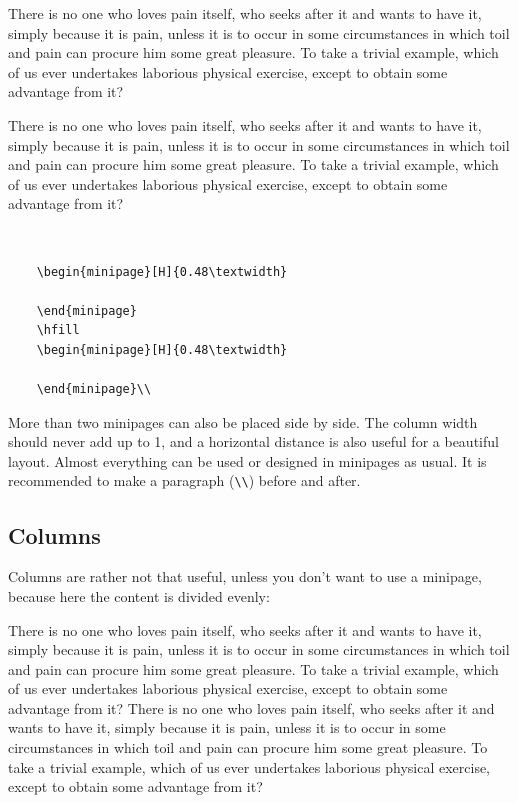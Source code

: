 \begin{minipage}[H]{0.48\textwidth}
	There is no one who loves pain itself, who seeks after it and wants to have it, simply because it is pain, unless it is to occur in some circumstances in which toil and pain can procure him some great pleasure. To take a trivial example, which of us ever undertakes laborious physical exercise, except to obtain some advantage from it?
\end{minipage}
\hfill
\begin{minipage}[H]{0.48\textwidth}
	There is no one who loves pain itself, who seeks after it and wants to have it, simply because it is pain, unless it is to occur in some circumstances in which toil and pain can procure him some great pleasure. To take a trivial example, which of us ever undertakes laborious physical exercise, except to obtain some advantage from it?
\end{minipage}\\

\begin{verbatim}
    \begin{minipage}[H]{0.48\textwidth}
    	
    \end{minipage}
    \hfill
    \begin{minipage}[H]{0.48\textwidth}
    	
    \end{minipage}\\
\end{verbatim}

More than two minipages can also be placed side by side. The column width should never add up to 1, and a horizontal distance is also useful for a beautiful layout. Almost everything can be used or designed in minipages as usual. It is recommended to make a paragraph (\verb|\\|) before and after.


\subsection{Columns}

Columns are rather not that useful, unless you don't want to use a minipage, because here the content is divided evenly:

\begin{multicols}{2}
	There is no one who loves pain itself, who seeks after it and wants to have it, simply because it is pain, unless it is to occur in some circumstances in which toil and pain can procure him some great pleasure. To take a trivial example, which of us ever undertakes laborious physical exercise, except to obtain some advantage from it? There is no one who loves pain itself, who seeks after it and wants to have it, simply because it is pain, unless it is to occur in some circumstances in which toil and pain can procure him some great pleasure. To take a trivial example, which of us ever undertakes laborious physical exercise, except to obtain some advantage from it?
\end{multicols}

